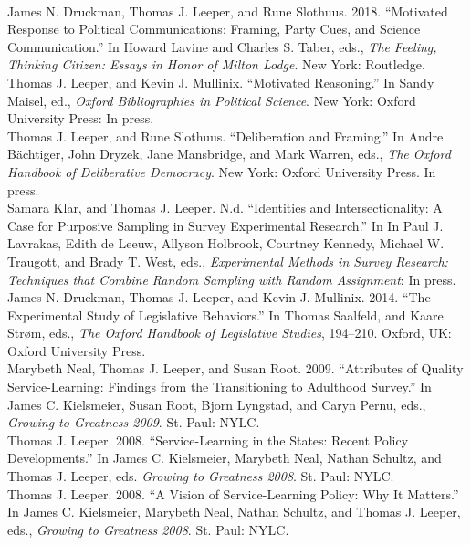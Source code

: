 \documentclass[12pt]{article}
\newcommand{\topic}[1]{\pagebreak[3]\indent {\color{lg}{\footnotesize #1 }}\\}
\newcommand{\entry}[1]{\indent {\color{lg}\guillemotright}\hspace{2pt}#1\vspace{.25em}\\}
\begin{document}
\topic{Chapters in Edited Volumes}
    \entry{James N. Druckman, Thomas J. Leeper, and Rune Slothuus. 2018. ``Motivated Response to Political Communications: Framing, Party Cues, and Science Communication.'' In Howard Lavine and Charles S. Taber, eds., \textit{The Feeling, Thinking Citizen: Essays in Honor of Milton Lodge}. New York: Routledge.
    \entry{Thomas J. Leeper, and Kevin J. Mullinix. ``Motivated Reasoning.'' In Sandy Maisel, ed., \textit{Oxford Bibliographies in Political Science}. New York: Oxford University Press: In press.}
    \entry{Thomas J. Leeper, and Rune Slothuus. ``Deliberation and Framing.'' In Andre B{\"a}chtiger, John Dryzek, Jane Mansbridge, and Mark Warren, eds., \textit{The Oxford Handbook of Deliberative Democracy}. New York: Oxford University Press. In press.}
	\entry{Samara Klar, and Thomas J. Leeper. N.d. ``Identities and Intersectionality: A Case for Purposive Sampling in Survey Experimental Research.'' In  In Paul J. Lavrakas, Edith de Leeuw, Allyson Holbrook, Courtney Kennedy, Michael W. Traugott, and Brady T. West, eds., \textit{Experimental Methods in Survey Research: Techniques that Combine Random Sampling with Random Assignment}: In press.}
    \entry{James N. Druckman, Thomas J. Leeper, and Kevin J. Mullinix. 2014. ``The Experimental Study of Legislative Behaviors.'' In Thomas Saalfeld, and Kaare Str\o m, eds., \textit{The Oxford Handbook of Legislative Studies}, 194--210. Oxford, UK: Oxford University Press.}
	\entry{Marybeth Neal, Thomas J. Leeper, and Susan Root. 2009. ``Attributes of Quality Service-Learning: Findings from the Transitioning to Adulthood Survey.'' In James C. Kielsmeier, Susan Root, Bjorn Lyngstad, and Caryn Pernu, eds., \textit{Growing to Greatness 2009}. St. Paul: NYLC.}
	\entry{Thomas J. Leeper. 2008. ``Service-Learning in the States: Recent Policy Developments.'' In James C. Kielsmeier, Marybeth Neal, Nathan Schultz, and Thomas J. Leeper, eds. \textit{Growing to Greatness 2008}. St. Paul: NYLC.}
	\entry{Thomas J. Leeper. 2008. ``A Vision of Service-Learning Policy: Why It Matters.'' In James C. Kielsmeier, Marybeth Neal, Nathan Schultz, and Thomas J. Leeper, eds., \textit{Growing to Greatness 2008}. St. Paul: NYLC.}

}
\end{document}
